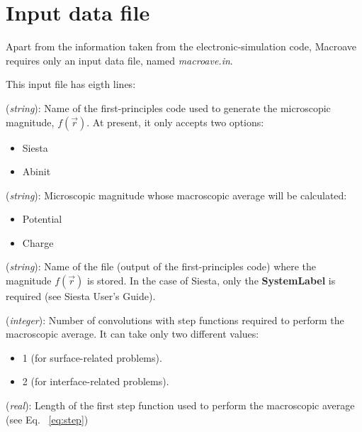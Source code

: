 \section{Input data file}
\label{section:input}

 Apart from the information taken from the electronic-simulation
 code, {\sc Macroave} requires only an input data file,
 named {\it macroave.in}.

 This input file has eigth lines:

 \begin{description}
 \itemsep 10pt
 \parsep 0pt

 \item[{\bf first line}] ({\it string}):
      Name of the first-principles code used to generate the
      microscopic magnitude, $f \left( \vec{r} \right)$.
      At present, it only accepts two options:

      \begin{itemize}
         \item Siesta
         \item Abinit
      \end{itemize}

 \item[{\bf second line}] ({\it string}):
      Microscopic magnitude whose macroscopic average will be calculated:
      \begin{itemize}
         \item Potential
         \item Charge
      \end{itemize}

 \item[{\bf third line}] ({\it string}):
      Name of the file (output of the first-principles code)
      where the magnitude $f \left( \vec{r} \right)$ is stored.
      In the case of {\sc Siesta}, only the {\bf SystemLabel} is required
      (see {\sc Siesta} User's Guide).

 \item[{\bf fourth line}] ({\it integer}):
      Number of convolutions with step functions required to
      perform the macroscopic average. It can take only two different
      values:
      \begin{itemize}
         \item 1 (for surface-related problems).
         \item 2 (for interface-related problems).
      \end{itemize}


 \item[{\bf fifth line}] ({\it real}):
      Length of the first step function used to perform
      the macroscopic average (see Eq. ~\ref{eq:step})


\end{description}
